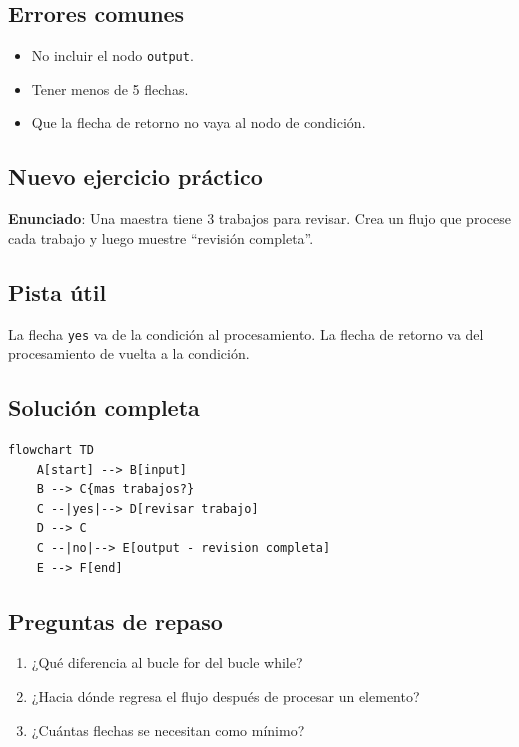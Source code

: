 \documentclass[12pt]{article}
\begin{document}
\subsection{Errores comunes}

\begin{itemize}
    \item No incluir el nodo \texttt{output}.
    \item Tener menos de 5 flechas.
    \item Que la flecha de retorno no vaya al nodo de condición.
\end{itemize}

\subsection{Nuevo ejercicio práctico}

\textbf{Enunciado}: Una maestra tiene 3 trabajos para revisar. Crea un flujo que procese cada trabajo y luego muestre ``revisión completa''.

\subsection{Pista útil}

La flecha \texttt{yes} va de la condición al procesamiento. La flecha de retorno va del procesamiento de vuelta a la condición.

\subsection{Solución completa}

\begin{lstlisting}[style=mermaidstyle]
flowchart TD
    A[start] --> B[input]
    B --> C{mas trabajos?}
    C --|yes|--> D[revisar trabajo]
    D --> C
    C --|no|--> E[output - revision completa]
    E --> F[end]
\end{lstlisting}

\subsection{Preguntas de repaso}

\begin{enumerate}
    \item ¿Qué diferencia al bucle for del bucle while?
    \item ¿Hacia dónde regresa el flujo después de procesar un elemento?
    \item ¿Cuántas flechas se necesitan como mínimo?
\end{enumerate}
\end{document}
